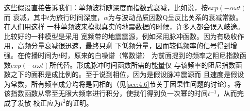 这些假设直接告诉我们：单频波将随深度而指数式衰减，比如说，按$exp(-\alpha \omega t)$而
衰减，其中$t$为旅行时间深度，$\alpha$为与波动品质因数Q呈反比关系的衰减常数。在人们用这样
一种单频波来模拟真实的地震数据的时候，许多人都会误入岐途。比较好的一种模型是采用
宽频带的地震震源，例如采用脉冲函数。因为有吸收作用，高频分量衰减很迅速，最终只剩
下低频分量，因而较低频率的信号得到增强。在传播时间为$t$时，原来的白噪谱（常数谱）
为前面提到的频率之阻尼指数函数$exp(-\alpha\omega t)$所代替。形成脉冲时间函数所需的能量仅
与该频率的阻尼指数函数之下的面积是成比例的。至于说到相位，因为是假设脉冲震源而
且速度是假设为常数，所有频率成分均将是同相的（见\ref{sec:4.6}节关于因果性问题的讨论）。将
该指数函数从零至无限大频率进行积分，使我们得到负一次幂的时间$t^{-1}$，从而完成了发散
校正应为$t^2$的证明。


